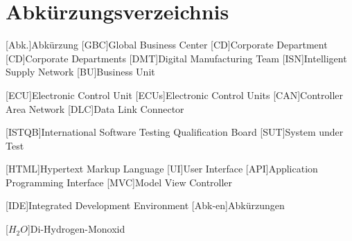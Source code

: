 
\chapter*{Abkürzungsverzeichnis}                   %

\begin{acronym}[DHBW]
 [Abk.]{Abkürzung}
 [GBC]{Global Business Center}
 [CD]{Corporate Department}
 [CD]{Corporate Departments}
 [DMT]{Digital Manufacturing Team}
 [ISN]{Intelligent Supply Network}
 [BU]{Business Unit}
 
 [ECU]{Electronic Control Unit}
 [ECUs]{Electronic Control Units}
 [CAN]{Controller Area Network}
 [DLC]{Data Link Connector}
 
 [ISTQB]{International Software Testing Qualification Board}
 [SUT]{System under Test}
 
 [HTML]{Hypertext Markup Language}
 [UI]{User Interface}
 [API]{Application Programming Interface}
 [MVC]{Model View Controller}

 [IDE]{Integrated Development Environment}
 [Abk-en]{Abkürzungen}

 [\ensuremath{H_2O}]{Di-Hydrogen-Monoxid}

\end{acronym}
